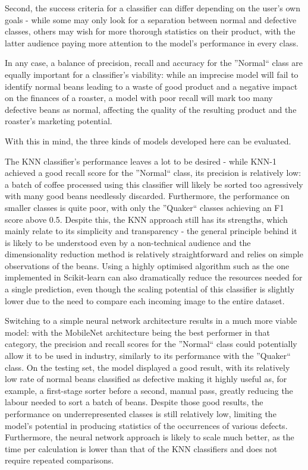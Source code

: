 Second, the success criteria for a classifier can differ depending on the user's own goals - while some may only look for
a separation between normal and defective classes, others may wish for more thorough statistics on their product, with
the latter audience paying more attention to the model's performance in every class.

In any case, a balance of precision, recall and accuracy for the ''Normal`` class are equally
important for a classifier's viability: while an imprecise model will fail to identify normal beans leading to
a waste of good product and a negative impact on the finances of a roaster, a model with poor recall will mark too many
defective beans as normal, affecting the quality of the resulting product and the roaster's marketing potential.

With this in mind, the three kinds of models developed here can be evaluated.

The KNN classifier's performance leaves a lot to be desired - while KNN-1 achieved a good recall score for the ''Normal``
class, its precision is relatively low: a batch of coffee processed using this classifier will likely be sorted too agressively
with many good beans needlessly discarded.
Furthermore, the performance on smaller classes is quite poor, with only the ''Quaker`` classes achieving an F1 score above
0.5.
Despite this, the KNN approach still has its strengths, which mainly relate to its simplicity and transparency -
the general principle behind it is likely to be understood even by a non-technical audience and the dimensionality reduction
method is relatively straightforward and relies on simple observations of the beans.
Using a highly optimised algorithm such as the one implemented in Scikit-learn can also dramatically reduce the resources
needed for a single prediction, even though the scaling potential of this classifier is slightly lower due to the need to
compare each incoming image to the entire dataset.

Switching to a simple neural network architecture results in a much more viable model: with the MobileNet architecture
being the best performer in that category, the precision and recall scores for the ''Normal`` class could potentially allow it
to be used in industry, similarly to its performance with the ''Quaker`` class.
On the testing set, the model displayed a good result, with its relatively low rate of normal beans classified as defective
making it highly useful as, for example, a first-stage sorter before a second, manual pass, greatly reducing the labour
needed to sort a batch of beans.
Despite those good results, the performance on underrepresented classes is still relatively low, limiting the model's
potential in producing statistics of the occurrences of various defects.
Furthermore, the neural network approach is likely to scale much better, as the time per calculation is lower than that of
the KNN classifiers and does not require repeated comparisons.

